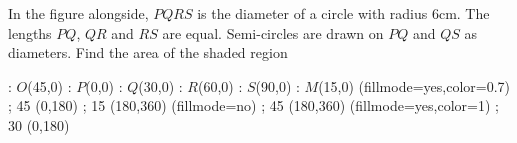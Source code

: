 
%
%
%
%
% 
% 

\question In the figure alongside, $PQRS$ is the diameter of a circle with radius 6cm.
The lengths $PQ$, $QR$ and $RS$ are equal. Semi-circles are drawn on $PQ$ and $QS$ as diameters.
Find the area of the shaded region

\insertQR{}

\ifprintanswers
\fi 
\begin{marginfigure}

    : $O$(45,0)
    : $P$(0,0)
    : $Q$(30,0)
    : $R$(60,0)
    : $S$(90,0)
    : $M$(15,0)
  \figdrawbegin{}
    \figset (fillmode=yes,color=0.7)
     ; 45 (0,180)
     ; 15 (180,360)
    \figset (fillmode=no)
     ; 45 (180,360)
    \figset (fillmode=yes,color=1)
    \figdrawline [101,102,103,104]
     ; 30 (0,180)
  \figdrawend
  \centerline{\box\figBoxA}

\end{marginfigure}

